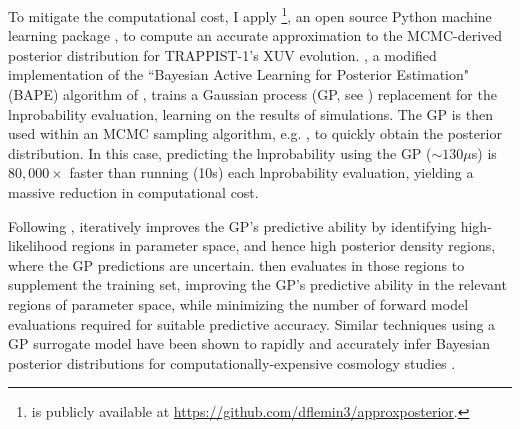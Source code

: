 To mitigate the computational cost, I apply \approxposterior\footnote{\approxposterior is publicly available at \href{https://github.com/dflemin3/approxposterior}{https://github.com/dflemin3/approxposterior}.}, an open source Python machine learning package \citep{FlemingVanderPlas2018}, to compute an accurate approximation to the \emcee MCMC-derived posterior distribution for TRAPPIST-1's XUV evolution. \approxposterior, a modified implementation of the ``Bayesian Active Learning for Posterior Estimation" (BAPE) algorithm of \citet{Kandasamy2017}, trains a Gaussian process (GP, see \citet{Rasmussen2006}) replacement for the lnprobability evaluation, learning on the results of \vplanet simulations. The GP is then used within an MCMC sampling algorithm, e.g. \emcee, to quickly obtain the posterior distribution. In this case, predicting the lnprobability using the GP (${\sim} 130 \mu$s) is $80,000 \times$ faster than running \vplanet (10s) each lnprobability evaluation, yielding a massive reduction in computational cost.

Following \citet{Kandasamy2017}, \approxposterior iteratively improves the GP's predictive ability by identifying high-likelihood regions in parameter space, and hence high posterior density regions, where the GP predictions are uncertain. \approxposterior then evaluates \vplanet in those regions to supplement the training set, improving the GP's predictive ability in the relevant regions of parameter space, while minimizing the number of forward model evaluations required for suitable predictive accuracy. Similar techniques using a GP surrogate model have been shown to rapidly and accurately infer Bayesian posterior distributions for computationally-expensive cosmology studies \citep[e.g.][]{Bird2019,McClintock2019}. 

